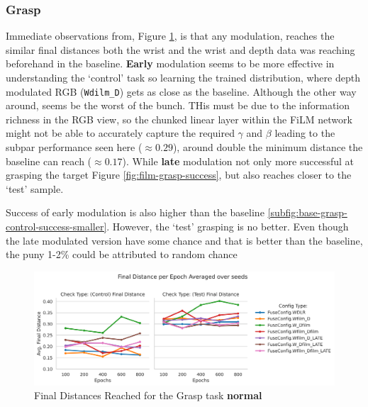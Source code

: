 \subsubsection{Grasp}
Immediate observations from, Figure \ref{fig:film-grasp-final}, is that any modulation, reaches the similar final distances both the wrist and the wrist and depth data was reaching beforehand in the baseline. \textbf{Early} modulation seems to be more effective in understanding the `control' task so learning the trained distribution, where depth modulated RGB (\verb|Wdilm_D|) gets as close as the baseline. Although the other way around, seems be the worst of the bunch. THis must be due to the information richness in the RGB view, so the chunked linear layer within the FiLM network might not be able to accurately capture the required $\gamma$ and $\beta$ leading to the subpar performance seen here ($\approx 0.29$), around double the minimum distance the baseline can reach ($\approx 0.17$). While \textbf{late} modulation not only more successful at grasping the target Figure \ref{fig:film-grasp-success}, but also reaches closer to the `test' sample. 

Success of early modulation is also higher than the baseline \ref{subfig:base-grasp-control-success-smaller}. However, the `test' grasping is no better. Even though the late modulated version have some chance and that is better than the baseline, the puny 1-2\% could be attributed to random chance 

\begin{figure}[H]
  \centering
  \includegraphics[width=\linewidth]{assets/evaluation/film/film-grasp-final.png}
  \caption{Final Distances Reached for the Grasp task \textbf{normal}}\label{fig:film-grasp-final}
\end{figure}

